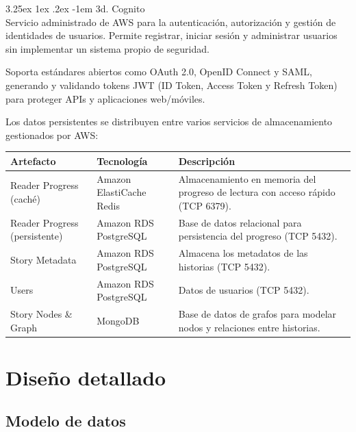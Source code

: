 \documentclass[a4paper,11 pt]{article}
\makeatletter
\newcounter{subsubsubsection}[subsubsection]
\renewcommand\paragraph{\@startsection{paragraph}{5}{\z@}%
  {3.25ex \@plus1ex \@minus.2ex}%
  {-1em}%
  {\normalfont\normalsize\bfseries}}
\makeatother
\begin{document}
\paragraph{3d. Cognito}\mbox{}\\

Servicio administrado de AWS para la autenticación, autorización y gestión de identidades de usuarios. Permite registrar, iniciar sesión y administrar usuarios sin implementar un sistema propio de seguridad.

Soporta estándares abiertos como OAuth 2.0, OpenID Connect y SAML, generando y validando tokens JWT (ID Token, Access Token y Refresh Token) para proteger APIs y aplicaciones web/móviles.


Los datos persistentes se distribuyen entre varios servicios de almacenamiento gestionados por AWS:

\begin{table}[H]
\centering
\footnotesize
\begin{tabular}{|M{0.2\textwidth}|M{0.3\textwidth}|M{0.3\textwidth}|}
 \hline
    \textbf{Artefacto} & \textbf{Tecnología} & \textbf{Descripción} \\
    \hline
    Reader Progress (caché) & Amazon ElastiCache Redis & Almacenamiento en memoria del progreso de lectura con acceso rápido (TCP 6379). \\
     \hline
     Reader Progress (persistente) & Amazon RDS PostgreSQL & Base de datos relacional para persistencia del progreso (TCP 5432). \\
     \hline
    Story Metadata & Amazon RDS PostgreSQL & Almacena los metadatos de las historias (TCP 5432). \\
     \hline
    Users & Amazon RDS PostgreSQL & Datos de usuarios (TCP 5432). \\
     \hline
     Story Nodes \& Graph & MongoDB & Base de datos de grafos para modelar nodos y relaciones entre historias. \\
     \hline
\end{tabular}
\end{table}


\section{Diseño detallado}
\subsection{Modelo de datos}
\end{document}
